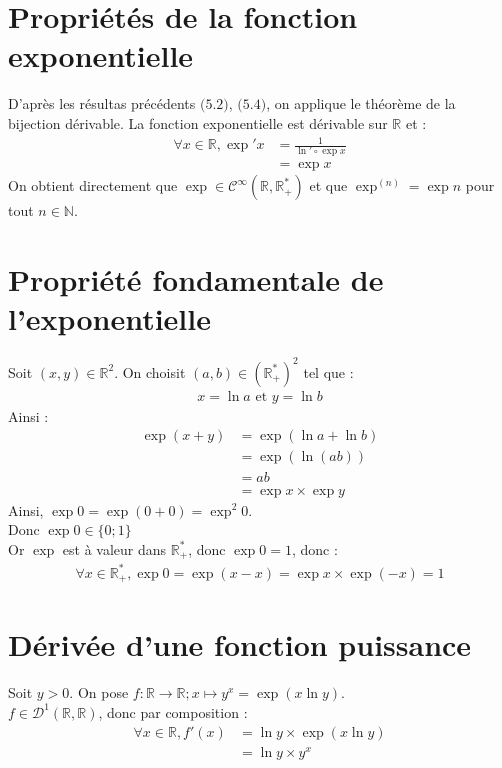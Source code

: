 \documentclass[../main.tex]{subfiles}
\begin{document}
\setcounter{section}{7}
\section{Propriétés de la fonction exponentielle}
D'après les résultas précédents $\text{(5.2)}$, $\text{(5.4)}$, on applique le théorème de la bijection dérivable. 
La fonction exponentielle est dérivable sur $\mathbb{R}$ et :
\begin{align*}
    \forall x \in \mathbb{R}, \exp' x &= \frac{1}{\ln' \circ \exp x} \\
    &= \exp x
\end{align*}
On obtient directement que $\exp \in \mathcal{C}^{\infty}(\mathbb{R}, \mathbb{R}_+^*)$ et que $\exp^{(n)} = \exp n$ pour tout $n \in \mathbb{N}$. \\

\section{Propriété fondamentale de l'exponentielle}
Soit $(x, y) \in \mathbb{R}^2$. On choisit $(a, b) \in (\mathbb{R}_+^*)^2$ tel que : 
\begin{align*}
    x = \ln a \text{ et } y = \ln b
\end{align*}
Ainsi : 
\begin{align*}
    \exp (x + y) &= \exp (\ln a + \ln b) \\
    &= \exp (\ln (ab)) \\
    &= ab \\
    &= \exp x \times \exp y
\end{align*}
Ainsi, $\exp 0 = \exp (0 + 0) = \exp^2 0$. \\
Donc $\exp 0 \in \{0 ; 1\}$ \\
Or $\exp$ est à valeur dans $\mathbb{R}_+^*$, donc $\exp 0 = 1$, donc :
\begin{align*}
    \forall x \in \mathbb{R}_+^*, \exp 0 = \exp (x - x) = \exp x \times \exp (-x) = 1
\end{align*}

\setcounter{section}{14}
\section{Dérivée d'une fonction puissance}
Soit $y > 0$. On pose $f:\mathbb{R} \to \mathbb{R} ; x \mapsto y^x = \exp (x \ln y)$. \\
$f \in \mathcal{D}^1(\mathbb{R}, \mathbb{R})$, donc par composition : 
\begin{align*}
    \forall x \in \mathbb{R}, f'(x) &= \ln y \times \exp (x \ln y) \\
    &= \ln y \times y^x
\end{align*}
\end{document}
